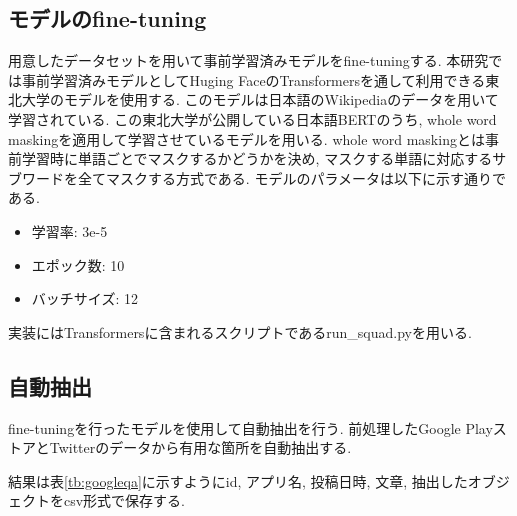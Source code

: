 \subsection{モデルのfine-tuning}
用意したデータセットを用いて事前学習済みモデルをfine-tuningする. 本研究では事前学習済みモデルとしてHuging FaceのTransformersを通して利用できる東北大学のモデル\cite{tohoku}を使用する. このモデルは日本語のWikipediaのデータを用いて学習されている\cite{tohoku}. 
この東北大学が公開している日本語BERTのうち, whole word maskingを適用して学習させているモデル\cite{masking}を用いる. whole word maskingとは事前学習時に単語ごとでマスクするかどうかを決め, マスクする単語に対応するサブワードを全てマスクする方式である. モデルのパラメータは以下に示す通りである. 
\begin{itemize}
  \item 学習率: 3e-5
  \item エポック数: 10
  \item バッチサイズ: 12
\end{itemize}

実装にはTransformersに含まれるスクリプトであるrun\_squad.pyを用いる. 

\subsection{自動抽出}
fine-tuningを行ったモデルを使用して自動抽出を行う. 前処理したGoogle PlayストアとTwitterのデータから有用な箇所を自動抽出する. 

結果は表\ref{tb:googleqa}に示すようにid, アプリ名, 投稿日時, 文章, 抽出したオブジェクトをcsv形式で保存する. 

